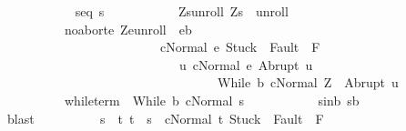 \begin{isabellebody}
\ \isanewline
\ \ \ \ \ \ \ \ \ \ s{\isacharunderscore}eq{\isacharunderscore}{\isasymsigma}{\isacharcolon}\ {\isachardoublequoteopen}s{\isacharequal}{\isasymsigma}{\isachardoublequoteclose}\ \isanewline
\ \ \ \ \ \ \ \ \ \ Z{\isacharunderscore}s{\isacharunderscore}unroll{\isacharcolon}\ {\isachardoublequoteopen}{\isacharparenleft}Z{\isacharcomma}s{\isacharparenright}\ {\isasymin}\ {\isacharquery}unroll{\isachardoublequoteclose}\ \isanewline
\ \ \ \ \ \ \ \ \ \ noabort{\isacharcolon}{\isachardoublequoteopen}{\isasymforall}e{\isachardot}\ {\isacharparenleft}Z{\isacharcomma}e{\isacharparenright}{\isasymin}{\isacharquery}unroll\ {\isasymlongrightarrow}\ e{\isasymin}b\isanewline
\ \ \ \ \ \ \ \ \ \ \ \ \ \ \ \ \ \ \ \ \ \ \ \ {\isasymlongrightarrow}\ {\isasymGamma}{\isasymturnstile}{\isasymlangle}c{\isacharcomma}Normal\ e{\isasymrangle}\ {\isasymRightarrow}{\isasymnotin}{\isacharparenleft}{\isacharbraceleft}Stuck{\isacharbraceright}\ {\isasymunion}\ Fault\ {\isacharbackquote}\ {\isacharparenleft}{\isacharminus}F{\isacharparenright}{\isacharparenright}\ {\isasymand}\ \isanewline
\ \ \ \ \ \ \ \ \ \ \ \ \ \ \ \ \ \ \ \ \ \ \ \ \ \ \ \ {\isacharparenleft}{\isasymforall}u{\isachardot}\ {\isasymGamma}{\isasymturnstile}{\isasymlangle}c{\isacharcomma}Normal\ e{\isasymrangle}\ {\isasymRightarrow}Abrupt\ u\ {\isasymlongrightarrow}\ \isanewline
\ \ \ \ \ \ \ \ \ \ \ \ \ \ \ \ \ \ \ \ \ \ \ \ \ \ \ \ \ \ \ \ \ \ {\isasymGamma}{\isasymturnstile}{\isasymlangle}While\ b\ c{\isacharcomma}Normal\ Z{\isasymrangle}\ {\isasymRightarrow}\ Abrupt\ u{\isacharparenright}{\isachardoublequoteclose}\ \isanewline
\ \ \ \ \ \ \ \ \ \ while{\isacharunderscore}term{\isacharcolon}\ \ {\isachardoublequoteopen}{\isasymGamma}{\isasymturnstile}{\isacharparenleft}While\ b\ c{\isacharparenright}{\isasymdown}Normal\ s{\isachardoublequoteclose}\ \isanewline
\ \ \ \ \ \ \ \ \ \ s{\isacharunderscore}in{\isacharunderscore}b{\isacharcolon}\ {\isachardoublequoteopen}s{\isasymin}b{\isachardoublequoteclose}\ \isanewline
\ \ \ \ \ \ \ \ \ \ \isamarkupfalse%
\ blast\isanewline
\ \ \ \ \ \ \ \ \isamarkupfalse%
\ {\isachardoublequoteopen}s\ {\isasymin}\ {\isacharbraceleft}t{\isachardot}\ t\ {\isacharequal}\ s\ {\isasymand}\ {\isasymGamma}{\isasymturnstile}{\isasymlangle}c{\isacharcomma}Normal\ t{\isasymrangle}\ {\isasymRightarrow}{\isasymnotin}{\isacharparenleft}{\isacharbraceleft}Stuck{\isacharbraceright}\ {\isasymunion}\ Fault\ {\isacharbackquote}\ {\isacharparenleft}{\isacharminus}F{\isacharparenright}{\isacharparenright}\ {\isasymand}\ \isanewline

\end{isabellebody}
